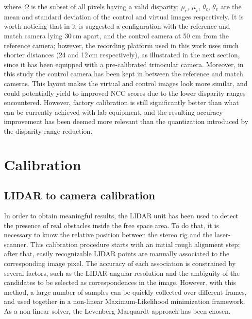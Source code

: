 where $\Omega$ is the subset of all pixels having a valid disparity; $\mu_c$, $\mu_v$, $\theta_c$, $\theta_v$ are the mean and standard deviation of the control and virtual images respectively.
It is worth noticing that in \cite{Morales2011} it is suggested a configuration with the reference and match camera lying 30\,cm apart, and the control camera at 50 cm from the reference camera; however, the recording platform used in this work uses much shorter distances (24 and 12\,cm respectively), as illustrated in the next section, since it has been equipped with a pre-calibrated trinocular camera. Moreover, in this study the control camera has been kept in between the reference and match cameras. This layout makes the virtual and control images look more similar, and could potentially yield to improved NCC scores due to the lower disparity ranges encountered. However, factory calibration is still significantly better than what can be currently achieved with lab equipment, and the resulting
accuracy improvement has been deemed more relevant than the quantization introduced by the disparity range reduction.

\section{Calibration}\label{ch:chapter03_02}

\subsection{LIDAR to camera calibration}\label{ch:chapter03_02_01}

In order to obtain meaningful results, the LIDAR unit has been used to detect the presence of real obstacles inside the free space area. To do that, it is necessary to know the relative position between the stereo rig and the laser-scanner. This calibration procedure starts with an initial rough alignment step; after that, easily recognizable LIDAR points are manually associated to the corresponding image pixel. The accuracy of each association is constrained by several factors, such as the LIDAR angular resolution and the ambiguity of the candidates to be selected as correspondences in the image. However, with this method, a large number of samples can be quickly collected over different frames, and used together in a non-linear Maximum-Likelihood minimization framework. As a non-linear solver, the Levenberg-Marquardt approach has been chosen.

